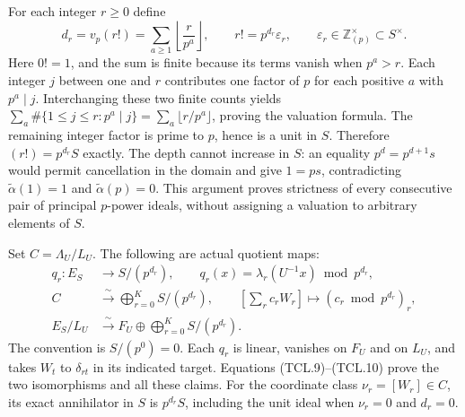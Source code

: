 For each integer \(r\geq0\) define
\[
 d_r=v_p(r!)=\sum_{a\geq1}\left\lfloor\frac{r}{p^a}\right\rfloor,
 \qquad r!=p^{d_r}\varepsilon_r,\qquad
 \varepsilon_r\in\mathbb Z_{(p)}^\times\subset S^\times.
 \tag{TCL.14}\label{eq:tcl-depth}
\]
Here \(0!=1\), and the sum is finite because its terms vanish
when \(p^a>r\). Each integer \(j\) between one and \(r\)
contributes one factor of \(p\) for each positive \(a\) with
\(p^a\mid j\). Interchanging these two finite counts yields
\(\sum_a\#\{1\leq j\leq r:p^a\mid j\}
=\sum_a\lfloor r/p^a\rfloor\), proving the valuation formula.
The remaining integer factor is prime to \(p\), hence is a unit
in \(S\). Therefore \((r!)=p^{d_r}S\) exactly. The depth cannot
increase in \(S\): an equality \(p^d=p^{d+1}s\) would permit
cancellation in the domain and give \(1=ps\), contradicting
\(\widetilde\alpha(1)=1\) and \(\widetilde\alpha(p)=0\).
This argument proves strictness of every consecutive pair of
principal \(p\)-power ideals, without assigning a valuation to
arbitrary elements of \(S\).

Set \(C=\Lambda_U/L_U\). The following are actual quotient maps:
\[
 \begin{split}
 q_r:E_S&\longrightarrow S/(p^{d_r}),\qquad
 q_r(x)=\lambda_r(U^{-1}x)\bmod p^{d_r},\\
 C&\xrightarrow{\ \sim\ }\bigoplus_{r=0}^K S/(p^{d_r}),
       \qquad [\sum_r c_rW_r]\longmapsto
                       (c_r\bmod p^{d_r})_r,\\
 E_S/L_U&\xrightarrow{\ \sim\ }
                 F_U\oplus\bigoplus_{r=0}^K S/(p^{d_r}).
 \end{split}
 \tag{TCL.15}\label{eq:tcl-quotient}
\]
The convention is \(S/(p^0)=0\). Each \(q_r\) is linear,
vanishes on \(F_U\) and on \(L_U\), and takes \(W_t\) to
\(\delta_{rt}\) in its indicated target. Equations
(TCL.9)--(TCL.10) prove the two isomorphisms and all these claims.
For the coordinate class \(\nu_r=[W_r]\in C\), its exact
annihilator in \(S\) is \(p^{d_r}S\), including the unit ideal
when \(\nu_r=0\) and \(d_r=0\).

